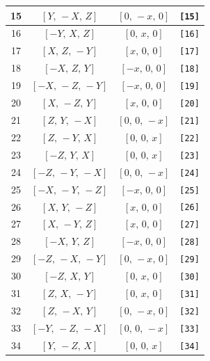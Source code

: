 \documentclass[fleqn,8pt]{jsarticle}
\begin{document}
\begin{longtable}{cccc}
15 & $\left[ Y,\, - X,\, Z \right]$ & $\left[ 0,\, - x,\, 0 \right]$ & {\tt [15]} \\ \hline
16 & $\left[ - Y,\, X,\, Z \right]$ & $\left[ 0,\, x,\, 0 \right]$ & {\tt [16]} \\ \hline
17 & $\left[ X,\, Z,\, - Y \right]$ & $\left[ x,\, 0,\, 0 \right]$ & {\tt [17]} \\ \hline
18 & $\left[ - X,\, Z,\, Y \right]$ & $\left[ - x,\, 0,\, 0 \right]$ & {\tt [18]} \\ \hline
19 & $\left[ - X,\, - Z,\, - Y \right]$ & $\left[ - x,\, 0,\, 0 \right]$ & {\tt [19]} \\ \hline
20 & $\left[ X,\, - Z,\, Y \right]$ & $\left[ x,\, 0,\, 0 \right]$ & {\tt [20]} \\ \hline
21 & $\left[ Z,\, Y,\, - X \right]$ & $\left[ 0,\, 0,\, - x \right]$ & {\tt [21]} \\ \hline
22 & $\left[ Z,\, - Y,\, X \right]$ & $\left[ 0,\, 0,\, x \right]$ & {\tt [22]} \\ \hline
23 & $\left[ - Z,\, Y,\, X \right]$ & $\left[ 0,\, 0,\, x \right]$ & {\tt [23]} \\ \hline
24 & $\left[ - Z,\, - Y,\, - X \right]$ & $\left[ 0,\, 0,\, - x \right]$ & {\tt [24]} \\ \hline
25 & $\left[ - X,\, - Y,\, - Z \right]$ & $\left[ - x,\, 0,\, 0 \right]$ & {\tt [25]} \\ \hline
26 & $\left[ X,\, Y,\, - Z \right]$ & $\left[ x,\, 0,\, 0 \right]$ & {\tt [26]} \\ \hline
27 & $\left[ X,\, - Y,\, Z \right]$ & $\left[ x,\, 0,\, 0 \right]$ & {\tt [27]} \\ \hline
28 & $\left[ - X,\, Y,\, Z \right]$ & $\left[ - x,\, 0,\, 0 \right]$ & {\tt [28]} \\ \hline
29 & $\left[ - Z,\, - X,\, - Y \right]$ & $\left[ 0,\, - x,\, 0 \right]$ & {\tt [29]} \\ \hline
30 & $\left[ - Z,\, X,\, Y \right]$ & $\left[ 0,\, x,\, 0 \right]$ & {\tt [30]} \\ \hline
31 & $\left[ Z,\, X,\, - Y \right]$ & $\left[ 0,\, x,\, 0 \right]$ & {\tt [31]} \\ \hline
32 & $\left[ Z,\, - X,\, Y \right]$ & $\left[ 0,\, - x,\, 0 \right]$ & {\tt [32]} \\ \hline
33 & $\left[ - Y,\, - Z,\, - X \right]$ & $\left[ 0,\, 0,\, - x \right]$ & {\tt [33]} \\ \hline
34 & $\left[ Y,\, - Z,\, X \right]$ & $\left[ 0,\, 0,\, x \right]$ & {\tt [34]} \\ \hline

\end{longtable}
\end{document}

